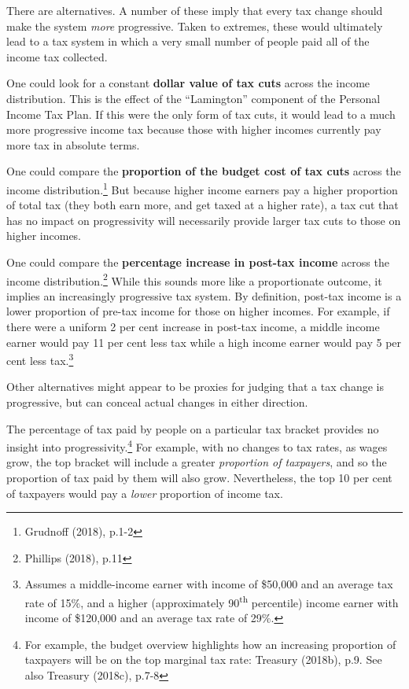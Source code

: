 \documentclass[submission]{grattan}\usepackage[]{graphicx}\usepackage[]{color}
\begin{document}
There are alternatives. A number of these imply that every tax change should make the system \emph{more} progressive. Taken to extremes, these would ultimately lead to a tax system in which a very small number of people paid all of the income tax collected.

One could look for a constant \textbf{dollar value of tax cuts} across the income distribution. This is the effect of the ``Lamington'' component of the Personal Income Tax Plan. If this were the only form of tax cuts, it would lead to a much more progressive income tax because those with higher incomes currently pay more tax in absolute terms.

One could compare the \textbf{proportion of the budget cost of tax cuts} across the income distribution.\footnote{Grudnoff (2018), p.1-2} But because higher income earners pay a higher proportion of total tax (they both earn more, and get taxed at a higher rate), a tax cut that has no impact on progressivity will necessarily provide larger tax cuts to those on higher incomes.

One could compare the \textbf{percentage increase in post-tax income} across the income distribution.\footnote{Phillips (2018), p.11} While this sounds more like a proportionate outcome, it implies an increasingly progressive tax system. By definition, post-tax income is a lower proportion of pre-tax income for those on higher incomes. For example, if there were a uniform 2 per cent increase in post-tax income, a middle income earner would pay 11 per cent less tax while a high income earner would pay 5 per cent less tax.\footnote{Assumes a middle-income earner with income of \$50,000 and an average tax rate of 15\%, and a higher (approximately 90\textsuperscript{th} percentile) income earner with income of \$120,000 and an average tax rate of 29\%.}

Other alternatives might appear to be proxies for judging that a tax change is progressive, but can conceal actual changes in either direction.

The percentage of tax paid by people on a particular tax bracket provides no insight into progressivity.\footnote{For example, the budget overview highlights how an increasing proportion of taxpayers will be on the top marginal tax rate: Treasury (2018b), p.9. See also Treasury (2018c), p.7-8} For example, with no changes to tax rates, as wages grow, the top bracket will include a greater \emph{proportion of taxpayers}, and so the proportion of tax paid by them will also grow. Nevertheless, the top 10 per cent of taxpayers would pay a \emph{lower} proportion of income tax.
\end{document}
